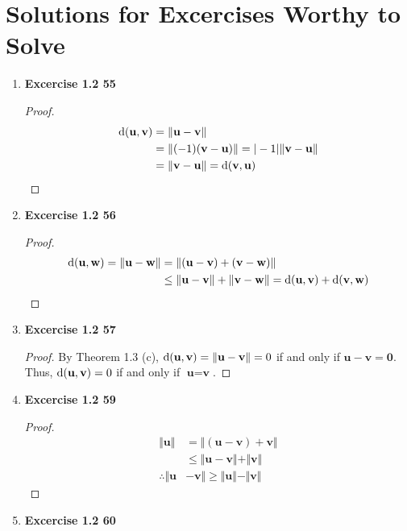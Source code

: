 \section{Solutions for Excercises Worthy to Solve}
\begin{enumerate}
	\item \textbf{Excercise 1.2 55}
		\begin{proof}
			\begin{align*}
				\textnormal{d}(\textbf{u},\textbf{v})
				&= \Vert\textbf{u}-\textbf{v}\Vert \\
				&= \Vert (-1)(\textbf{v}-\textbf{u})\Vert
				= |-1|\Vert\textbf{v}-\textbf{u}\Vert \\
				&= \Vert\textbf{v}-\textbf{u}\Vert = \textnormal{d}(\textbf{v},\textbf{u})
			\end{align*}
		\end{proof}
	\item \textbf{Excercise 1.2 56}
		\begin{proof}
			\begin{align*}
			\textnormal{d}(\textbf{u},\textbf{w}) 
			= \Vert\textbf{u} - \textbf{w}\Vert
			&= \Vert(\textbf{u}-\textbf{v})+(\textbf{v}-\textbf{w})\Vert \\
			&\le \Vert\textbf{u}-\textbf{v}\Vert + \Vert\textbf{v}-\textbf{w}\Vert
			= \textnormal{d}(\textbf{u},\textbf{v}) + \textnormal{d}(\textbf{v},\textbf{w})
			\end{align*}
		\end{proof}
	\item \textbf{Excercise 1.2 57}
		\begin{proof}
			By Theorem 1.3 (c), $\textnormal{d}(\textbf{u},\textbf{v}) = \Vert\textbf{u}-\textbf{v}\Vert = 0$ if and only if $\textbf{u}-\textbf{v}=\textbf{0}$. Thus, $\textnormal{d}(\textbf{u},\textbf{v})=0$ if and only if $\textbf{u}=\textbf{v}$.
		\end{proof}
	\item \textbf{Excercise 1.2 59}
		\begin{proof}
			\begin{align*}
				\Vert\textbf{u}\Vert
				&= \Vert(\textbf{u}-\textbf{v})+\textbf{v}\Vert \\
				&\le \Vert\textbf{u}-\textbf{v}\Vert + \Vert\textbf{v}\Vert \\
				\therefore \Vert\textbf{u}&-\textbf{v}\Vert \ge \Vert\textbf{u}\Vert - \Vert\textbf{v}\Vert
			\end{align*}
		\end{proof}
	\item \textbf{Excercise 1.2 60} \\\\

\end{enumerate}
